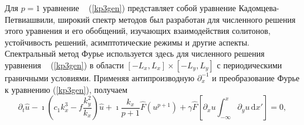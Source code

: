Для $ p = 1 $ уравнение ~ (\ref {kp3gen}) представляет собой уравнение Кадомцева-Петвиашвили, широкий спектр методов \cite{porrogue, Lu2003, klein2007, Infeld1995, Kao2012, Kodama2009} был разработан для численного решения этого уравнения и его обобщений, изучающих взаимодействия солитонов, устойчивость решений, асимптотические режимы и другие аспекты. 
Спектральный метод Фурье используется здесь для численного решения уравнения ~ (\ref {kp3gen}) в области $\left[-L_x, L_x\right] \times \left[-L_y, L_y\right]$ с периодическими граничными условиями. Применяя антипроизводную $\partial_x^{-1}$ и преобразование Фурье к уравнению (\ref {kp3gen}), получаем
\begin{equation}
	\label{KP3F}
	\partial_t \hat{u} - \imath\left( c_1 k_x^3 - f \frac{k_y^2}{k_x} \right) \hat{u} + \imath \frac{k_x}{p+1} \hat{F} \left(u^{p+1}\right)+\gamma \hat{F} \left[\partial_x u \int_{-\infty}^x \partial_y u \, \mathrm{d}x'\right]=0, 
\end{equation}
